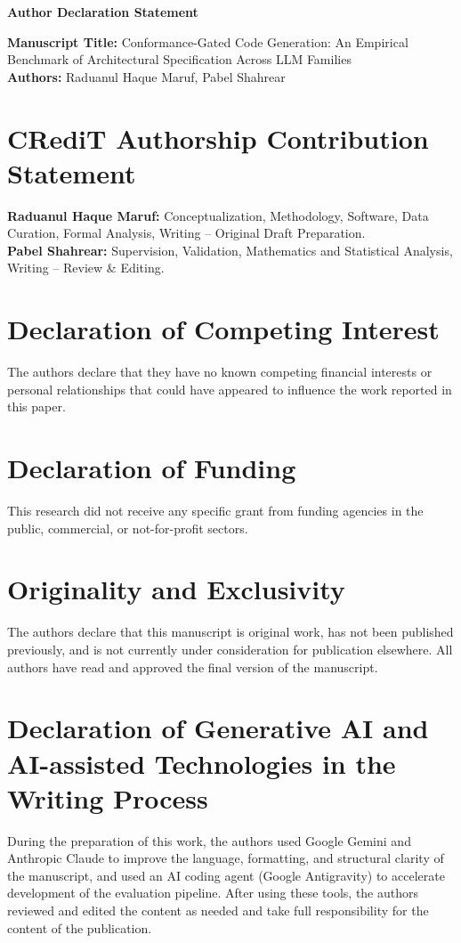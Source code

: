 \documentclass[12pt,a4paper]{article}
\begin{document}
\begin{center}
    \Large\textbf{Author Declaration Statement}
\end{center}

\vspace{0.5cm}

\noindent\textbf{Manuscript Title:} Conformance-Gated Code Generation: An Empirical Benchmark of Architectural Specification Across LLM Families \\
\textbf{Authors:} Raduanul Haque Maruf, Pabel Shahrear

\vspace{0.5cm}

\section*{CRediT Authorship Contribution Statement}
\textbf{Raduanul Haque Maruf:} Conceptualization, Methodology, Software, Data Curation, Formal Analysis, Writing -- Original Draft Preparation. \\
\textbf{Pabel Shahrear:} Supervision, Validation, Mathematics and Statistical Analysis, Writing -- Review \& Editing.

\section*{Declaration of Competing Interest}
The authors declare that they have no known competing financial interests or personal relationships that could have appeared to influence the work reported in this paper.

\section*{Declaration of Funding}
This research did not receive any specific grant from funding agencies in the public, commercial, or not-for-profit sectors.

\section*{Originality and Exclusivity}
The authors declare that this manuscript is original work, has not been published previously, and is not currently under consideration for publication elsewhere. All authors have read and approved the final version of the manuscript.

\section*{Declaration of Generative AI and AI-assisted Technologies in the Writing Process}
During the preparation of this work, the authors used Google Gemini and Anthropic Claude to improve the language, formatting, and structural clarity of the manuscript, and used an AI coding agent (Google Antigravity) to accelerate development of the evaluation pipeline. After using these tools, the authors reviewed and edited the content as needed and take full responsibility for the content of the publication.
\end{document}
